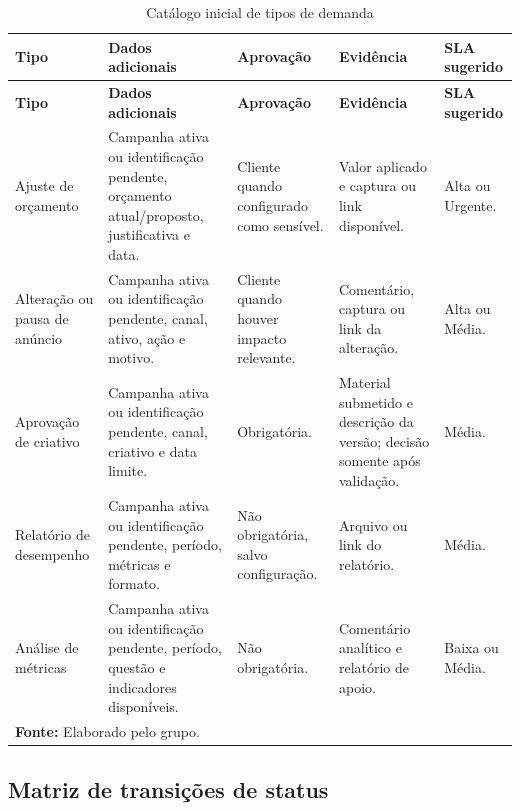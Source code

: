 \begin{longtable}{p{}p{}p{}p{}p{}}
\caption{Catálogo inicial de tipos de demanda}\label{tab:tipos-demanda}\\
\hline
\textbf{Tipo} & \textbf{Dados adicionais} & \textbf{Aprovação} & \textbf{Evidência} & \textbf{SLA sugerido} \\
\hline
\endfirsthead
\hline
\textbf{Tipo} & \textbf{Dados adicionais} & \textbf{Aprovação} & \textbf{Evidência} & \textbf{SLA sugerido} \\
\hline
\endhead
Ajuste de orçamento & Campanha ativa ou identificação pendente, orçamento atual/proposto, justificativa e data. & Cliente quando configurado como sensível. & Valor aplicado e captura ou link disponível. & Alta ou Urgente. \\
Alteração ou pausa de anúncio & Campanha ativa ou identificação pendente, canal, ativo, ação e motivo. & Cliente quando houver impacto relevante. & Comentário, captura ou link da alteração. & Alta ou Média. \\
Aprovação de criativo & Campanha ativa ou identificação pendente, canal, criativo e data limite. & Obrigatória. & Material submetido e descrição da versão; decisão somente após validação. & Média. \\
Relatório de desempenho & Campanha ativa ou identificação pendente, período, métricas e formato. & Não obrigatória, salvo configuração. & Arquivo ou link do relatório. & Média. \\
Análise de métricas & Campanha ativa ou identificação pendente, período, questão e indicadores disponíveis. & Não obrigatória. & Comentário analítico e relatório de apoio. & Baixa ou Média. \\
\hline
\multicolumn{5}{l}{\footnotesize\textbf{Fonte:} Elaborado pelo grupo.}
\end{longtable}

\subsection{Matriz de transições de status}


